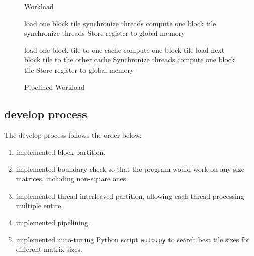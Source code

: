 \documentclass{article}
\begin{document}
\begin{figure}[h]
    \centering
    \begin{minipage}{0.47\textwidth}
        \centering
        \begin{algorithm}[H]
            \caption{Workload}
            \label{alg:workload}
            \begin{algorithmic}[1]
                \Repeat
                    \State load one block tile
                    \State synchronize threads
                    \State compute one block tile
                    \State synchronize threads
                \State Store register to global memory
            \end{algorithmic}
        \end{algorithm}
    \end{minipage}
    \hspace{0.5cm}
    \begin{minipage}{0.47\textwidth}
        \centering
        \begin{algorithm}[H]
            \caption{Pipelined Workload}
            \label{alg:pipeline}
            \begin{algorithmic}[1]
                \State load one block tile to one cache
                \Repeat
                    \State compute one block tile
                    \State load next block tile to the other cache
                    \State Synchronize threads
                \State compute one block tile
                \State Store register to global memory
            \end{algorithmic}
        \end{algorithm}
    \end{minipage}
\end{figure}

\subsection{develop process}
The develop process follows the order below:
\begin{enumerate}
    \item implemented block partition.
    \item implemented boundary check so that the program would work on any size matrices, including non-square ones.
    \item implemented thread interleaved partition, 
    allowing each thread processing multiple entire.
    \item implemented pipelining.
    \item implemented auto-tuning Python script \texttt{auto.py} to search best tile sizes for different matrix sizes.
\end{enumerate}
\end{document}
